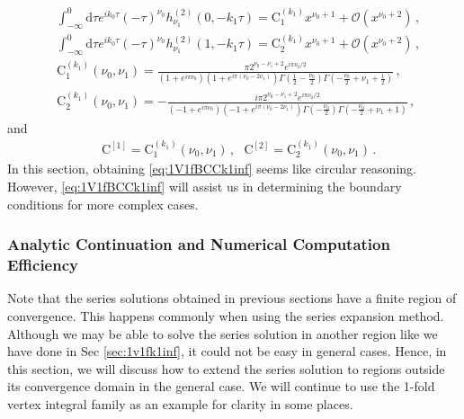 \documentclass[a4paper,11pt]{article}
\newcommand{\nn}{\nonumber}
\newcommand{\nd}{\mathrm{d}}
\begin{document}
\begin{align}
&\int_{-\infty}^0 \nd \tau e^{ i k_0 \tau} (-\tau)^{\nu_0} h^{(2)}_{\nu_1}(0,-k_1\tau)=\text{C}_1^{(k_1)} x^{\nu_0+1} + \mathcal{O}(x^{\nu_0+2}) \, , \nn\\
&\int_{-\infty}^0 \nd \tau e^{ i k_0 \tau} (-\tau)^{\nu_0} h^{(2)}_{\nu_1}(1,-k_1\tau)=\text{C}_2^{(k_1)} x^{\nu_0+1} + \mathcal{O}(x^{\nu_0+2}) \, , \nn\\
&\text{C}_1^{(k_1)}(\nu_0,\nu_1) =\frac{\pi  2^{\nu _0-\nu _1+2} e^{i \pi \nu_0/2 } }
{ \left(1+e^{i \pi  \nu _0}\right)
\left(1+e^{i \pi  \left(\nu _0-2 \nu _1\right)}\right) 
\Gamma \left(\frac{1}{2}-\frac{\nu _0}{2}\right)
\Gamma\left(-\frac{\nu _0}{2}+\nu _1+\frac{1}{2}\right)}  \,,\nn\\
&\text{C}_2^{(k_1)}(\nu_0,\nu_1) =-\frac{i \pi  2^{\nu _0-\nu _1+2} e^{i \pi \nu_0 /2} }
{\left(-1+e^{i \pi  \nu _0}\right)
\left(-1+e^{i \pi  \left(\nu _0-2 \nu _1\right)}\right) 
\Gamma \left(-\frac{\nu _0}{2}\right) 
\Gamma\left(-\frac{\nu _0}{2}+\nu _1+1\right)} \, , \label{eq:1V1fBCCk1inf}
\end{align}
and
\begin{align}
& \text{C}^{[1]}=\text{C}_1^{(k_1)}(\nu_0,\nu_1) \,,~~~ \text{C}^{[2]}=\text{C}_2^{(k_1)}(\nu_0,\nu_1)      \, . 
\end{align}
In this section, obtaining \eqref{eq:1V1fBCCk1inf} seems like circular reasoning. However, \eqref{eq:1V1fBCCk1inf} will assist us in determining the boundary conditions for more complex cases.


\subsubsection{Analytic Continuation and Numerical Computation Efficiency} \label{sec:1V1fcontinue}

Note that the series solutions obtained in previous sections have a finite region of convergence. This happens commonly when using the series expansion method. 
Although we may be able to solve the series solution in another region like we have done in Sec \ref{sec:1v1fk1inf}, it could not be easy in general cases. Hence, in this section, we will discuss how to extend the series solution to regions outside its convergence domain in the general case. We will continue to use the 1-fold vertex integral family as an example for clarity in some places.
\end{document}
